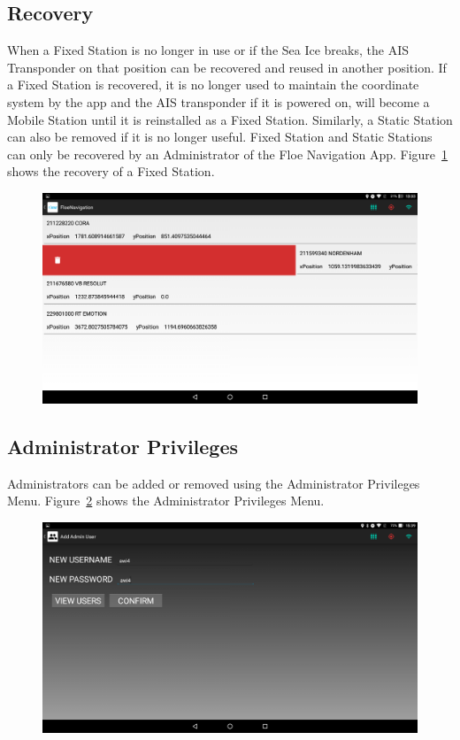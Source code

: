\subsection{Recovery}
\label{subsec:subsec7_2_5}
\noindent
When a Fixed Station is no longer in use or if the Sea Ice breaks, the AIS Transponder on that position can be recovered and reused in another position. If a Fixed Station is recovered, it is no longer used to maintain the coordinate system by the app and the AIS transponder if it is powered on, will become a Mobile Station until it is reinstalled as a Fixed Station. Similarly, a Static Station can also be removed if it is no longer useful. Fixed Station and Static Stations can only be recovered by an Administrator of the Floe Navigation App.  Figure~\ref{fig:CH7Recovery} shows the recovery of a Fixed Station. 
\begin{figure}[h]
	\centering
	\includegraphics[height=0.3\textheight]{fig07/Recovery.png}
	\label{fig:CH7Recovery}
\end{figure}
%
\subsection{Administrator Privileges}
\label{subsec:subsec7_2_6}
\noindent
Administrators can be added or removed using the Administrator Privileges Menu. Figure~\ref{fig:CH7AdminPrivileges} shows the Administrator Privileges Menu. 
\begin{figure}[h]
	\centering
	\includegraphics[height=0.3\textheight]{fig07/AdminPrivileges.png}
	\label{fig:CH7AdminPrivileges}
\end{figure}
%
